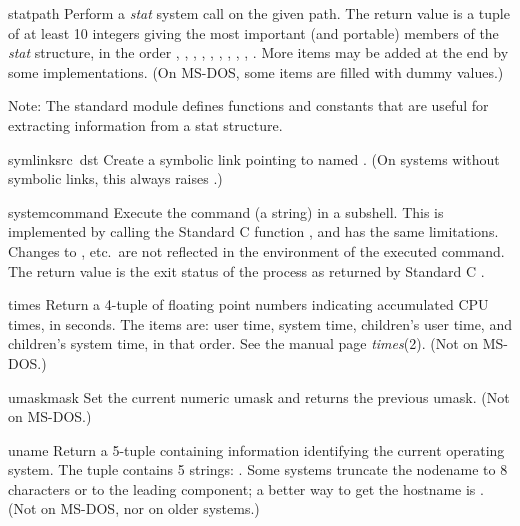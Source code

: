 \begin{funcdesc}{stat}{path}
Perform a {\em stat} system call on the given path.  The return value
is a tuple of at least 10 integers giving the most important (and
portable) members of the {\em stat} structure, in the order
,
,
,
,
,
,
,
,
,
.
More items may be added at the end by some implementations.
(On MS-DOS, some items are filled with dummy values.)

Note: The standard module  defines functions and constants
that are useful for extracting information from a stat structure.
\end{funcdesc}

\begin{funcdesc}{symlink}{src\, dst}
Create a symbolic link pointing to  named .  (On
systems without symbolic links, this always raises
.)
\end{funcdesc}

\begin{funcdesc}{system}{command}
Execute the command (a string) in a subshell.  This is implemented by
calling the Standard C function , and has the same
limitations.  Changes to ,  etc.\ are
not reflected in the environment of the executed command.  The return
value is the exit status of the process as returned by Standard C
.
\end{funcdesc}

\begin{funcdesc}{times}{}
Return a 4-tuple of floating point numbers indicating accumulated CPU
times, in seconds.  The items are: user time, system time, children's
user time, and children's system time, in that order.  See the \UNIX{}
manual page {\it times}(2).  (Not on MS-DOS.)
\end{funcdesc}

\begin{funcdesc}{umask}{mask}
Set the current numeric umask and returns the previous umask.
(Not on MS-DOS.)
\end{funcdesc}

\begin{funcdesc}{uname}{}
Return a 5-tuple containing information identifying the current
operating system.  The tuple contains 5 strings:
.
Some systems truncate the nodename to 8
characters or to the leading component; a better way to get the
hostname is .  (Not on MS-DOS, nor on older
\UNIX{} systems.)
\end{funcdesc}

